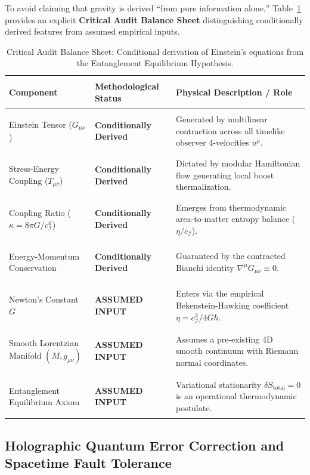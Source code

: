 \documentclass[11pt,a4paper]{article}
\begin{document}
To avoid claiming that gravity is derived ``from pure information alone,'' Table~\ref{tab:audit_balance} provides an explicit \textbf{Critical Audit Balance Sheet} distinguishing conditionally derived features from assumed empirical inputs.

\begin{table}[htbp]
\centering
\small
\begin{tabularx}{\linewidth}{>{\bfseries\raggedright}p{3.8cm} >{\centering}p{2.6cm} X}
\toprule
Component & Methodological Status & Physical Description / Role \\
\midrule
Einstein Tensor ($G_{\mu\nu}$) & \textbf{Conditionally Derived} & Generated by multilinear contraction across all timelike observer 4-velocities $u^\mu$. \\
\addlinespace
Stress-Energy Coupling ($T_{\mu\nu}$) & \textbf{Conditionally Derived} & Dictated by modular Hamiltonian flow generating local boost thermalization. \\
\addlinespace
Coupling Ratio ($\kappa = 8\pi G / c_{\mathcal{I}}^4$) & \textbf{Conditionally Derived} & Emerges from thermodynamic area-to-matter entropy balance ($\eta / c_{\mathcal{I}}$). \\
\addlinespace
Energy-Momentum Conservation & \textbf{Conditionally Derived} & Guaranteed by the contracted Bianchi identity $\nabla^\mu G_{\mu\nu} \equiv 0$. \\
\addlinespace
Newton's Constant $G$ & \textbf{ASSUMED INPUT} & Enters via the empirical Bekenstein-Hawking coefficient $\eta = c_{\mathcal{I}}^3 / 4G\hbar$. \\
\addlinespace
Smooth Lorentzian Manifold $(M, g_{\mu\nu})$ & \textbf{ASSUMED INPUT} & Assumes a pre-existing 4D smooth continuum with Riemann normal coordinates. \\
\addlinespace
Entanglement Equilibrium Axiom & \textbf{ASSUMED INPUT} & Variational stationarity $\delta S_{\text{total}} = 0$ is an operational thermodynamic postulate. \\
\bottomrule
\end{tabularx}
\caption{Critical Audit Balance Sheet: Conditional derivation of Einstein's equations from the Entanglement Equilibrium Hypothesis.}
\label{tab:audit_balance}
\end{table}

\subsection{Holographic Quantum Error Correction and Spacetime Fault Tolerance}
\end{document}
